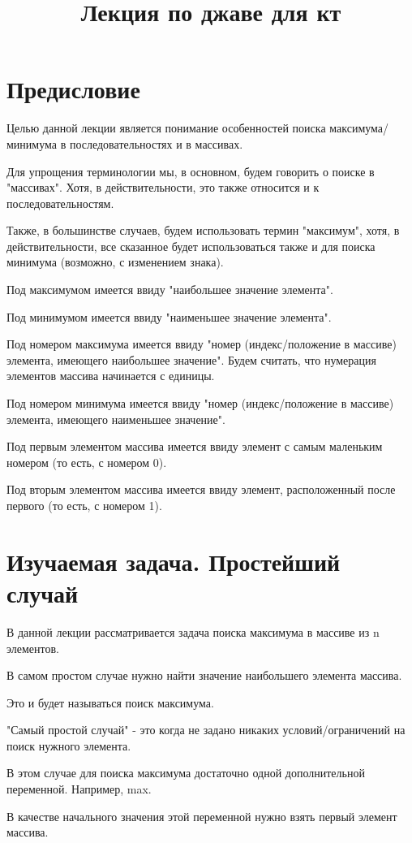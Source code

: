 \documentclass[a4paper]{article}
\title{Лекция по джаве для кт}
\author{}
\date{}
\begin{document}
    \maketitle
    \section{Предисловие} 
Целью данной лекции является понимание особенностей поиска максимума/минимума в последовательностях и в массивах.

Для упрощения терминологии мы, в основном, будем говорить о поиске в "массивах".
Хотя, в действительности, это также относится и к последовательностям.

Также, в большинстве случаев, будем использовать термин "максимум", хотя, в действительности, все сказанное будет использоваться также и для поиска минимума (возможно, с изменением знака).

Под максимумом имеется ввиду "наибольшее значение элемента".

Под минимумом имеется ввиду "наименьшее значение элемента".

Под номером максимума имеется ввиду "номер (индекс/положение в массиве) элемента, имеющего наибольшее значение".
Будем считать, что нумерация элементов массива начинается с единицы.

Под номером минимума имеется ввиду "номер (индекс/положение в массиве) элемента, имеющего наименьшее значение".

Под первым элементом массива имеется ввиду элемент с самым маленьким номером (то есть, с номером 0).

Под вторым элементом массива имеется ввиду элемент, расположенный после первого (то есть, с номером 1).
\section{Изучаемая задача. Простейший случай}
В данной лекции рассматривается задача поиска максимума в массиве из n элементов.

В самом простом случае нужно найти значение наибольшего элемента массива.

Это и будет называться поиск максимума.

"Самый простой случай" - это когда не задано никаких условий/ограничений на поиск нужного элемента.

В этом случае для поиска максимума достаточно одной дополнительной переменной.
Например, max.

В качестве начального значения этой переменной нужно взять первый элемент массива.
\end{document}
